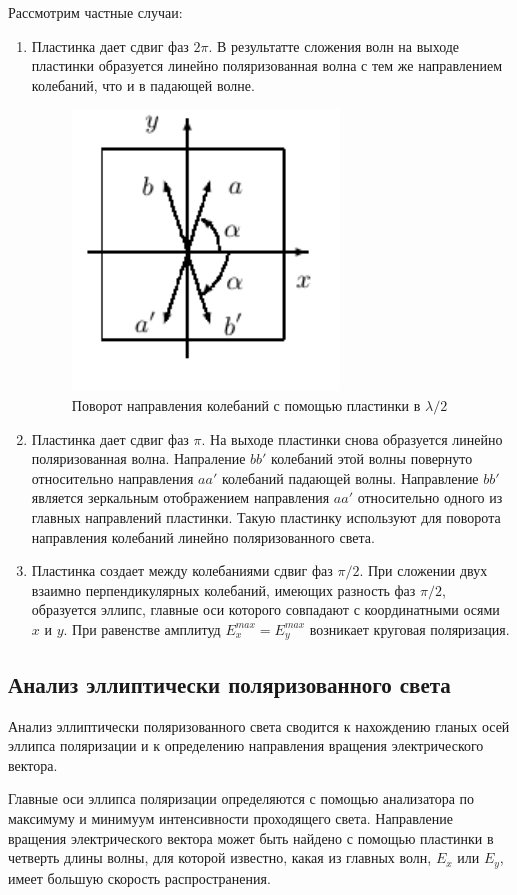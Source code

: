 \documentclass[a4paper,12pt]{article}
\begin{document}
Рассмотрим частные случаи:
\begin{enumerate}
    \item Пластинка дает сдвиг фаз $2\pi$. В результатте сложения волн на выходе пластинки образуется линейно поляризованная волна с тем же направлением колебаний, что и в падающей волне.
    \begin{figure}[h]
    \centering
    \includegraphics[width=0.2\linewidth]{img2.png}
    \caption{Поворот направления колебаний с помощью пластинки в $\lambda/2$}
    \label{img2}
    \end{figure}
    \item Пластинка дает сдвиг фаз $\pi$. На выходе пластинки снова образуется линейно поляризованная волна. Напраление $bb'$ колебаний этой волны повернуто относительно направления $aa'$ колебаний падающей волны. Направление $bb'$ является зеркальным отображением направления $aa'$ относительно одного из главных направлений пластинки. Такую пластинку используют для поворота направления колебаний линейно поляризованного света.
    \item Пластинка создает между колебаниями сдвиг фаз $\pi/2$. При сложении двух взаимно перпендикулярных колебаний, имеющих разность фаз $\pi/2$, образуется эллипс, главные оси которого совпадают с координатными осями $x$ и $y$. При равенстве амплитуд $E_x^{max}=E_y^{max}$ возникает круговая поляризация.
\end{enumerate}

\subsection{Анализ эллиптически поляризованного света}

Анализ эллиптически поляризованного света сводится к нахождению гланых осей эллипса поляризации и к определению направления вращения электрического вектора.

Главные оси эллипса поляризации определяются с помощью анализатора по максимуму и минимуум интенсивности проходящего света. Направление вращения электрического вектора может быть найдено с помощью пластинки в четверть длины волны, для которой известно, какая из главных волн, $E_x$ или $E_y$, имеет большую скорость распространения.
\end{document}
